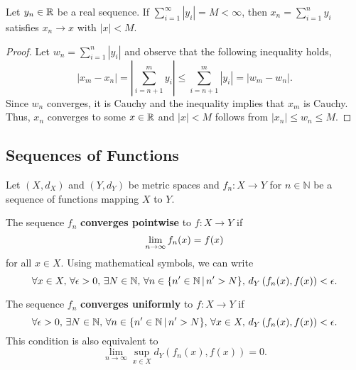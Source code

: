 \begin{lemma} \label{lem:abs_sum_convergence}
Let $y_n \in \mathbb{R}$ be a real sequence.
If $\sum_{i=1}^\infty |y_i| = M < \infty$, then $x_n = \sum_{i=1}^n y_i$ satisfies $x_n \to x$ with $|x|<M$.
\end{lemma}
\begin{proof}
Let $w_n = \sum_{i=1}^n |y_i|$ and observe that the following inequality holds,
\[|x_m - x_n| = \left| \sum_{i=n+1}^m y_i \right| \leq \sum_{i=n+1}^m |y_i| = | w_m - w_n|. \]
Since $w_n$ converges, it is Cauchy and %
the inequality implies that $x_m$ is Cauchy.
Thus, $x_n$ converges to some $x\in \mathbb{R}$ and $|x| < M$ follows from  $|x_n| \leq w_n \leq M$.
\end{proof}


\subsection{Sequences of Functions}

Let $(X,d_X)$ and $(Y,d_Y)$ be metric spaces and
$f_n \colon X \to Y$ for $n\in \mathbb{N}$ be a sequence of functions mapping $X$ to $Y$.

\begin{definition}
The sequence $f_n$ \textbf{converges pointwise} to $f\colon X \to Y$ if \vspace{-1mm}
\[ \lim_{n\to \infty} f_n (x) = f(x) \vspace*{-1mm} \]
for all $x \in X$.
Using mathematical symbols, we can write \vspace{-1mm}
\[ \forall x\in X, \, \forall \epsilon > 0, \, \exists N\in \mathbb{N}, \, \forall n \in \{ n' \in \mathbb{N}\,|\, n'>N \}, \, d_Y \left( f_n(x),f(x) \right) < \epsilon. \vspace*{-1mm} \]
\end{definition}

\begin{definition}
The sequence $f_n$ \textbf{converges uniformly} to $f \colon X \to Y$ if \vspace{-1mm}
\[ \forall \epsilon > 0, \, \exists N\in \mathbb{N}, \, \forall n \in \{ n' \in \mathbb{N}\,|\, n'>N \}, \, \forall x\in X, \, d_Y \left( f_n(x),f(x) \right) < \epsilon. \vspace*{-1mm} \]
This condition is also equivalent to \vspace{-1mm}
\[ \lim_{n\to \infty} \sup_{x\in X} d_Y \left( f_n (x) , f(x) \right) = 0. \]
 \end{definition}

